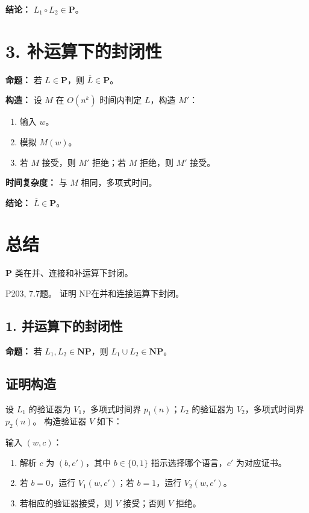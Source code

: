 \documentclass[11pt,addpoints,answers]{exam}
\begin{document}
\begin{questions}
\begin{solution}
    \textbf{结论：} $L_1 \circ L_2 \in \mathbf{P}$。
    \section*{3. 补运算下的封闭性}
    \textbf{命题：} 若 $L \in \mathbf{P}$，则 $\overline{L} \in \mathbf{P}$。
    
    \textbf{构造：} 设 $M$ 在 $O(n^k)$ 时间内判定 $L$，构造 $M'$：
    \begin{enumerate}
        \item 输入 $w$。
        \item 模拟 $M(w)$。
        \item 若 $M$ 接受，则 $M'$ 拒绝；若 $M$ 拒绝，则 $M'$ 接受。
    \end{enumerate}
    \textbf{时间复杂度：} 与 $M$ 相同，多项式时间。
    
    \textbf{结论：} $\overline{L} \in \mathbf{P}$。
    \section*{总结}
    $\mathbf{P}$ 类在并、连接和补运算下封闭。
\end{solution}

\question P203, 7.7题。
证明 NP在并和连接运算下封闭。
\begin{solution}
    
    \section*{1. 并运算下的封闭性}
    
    \textbf{命题：} 若 $L_1, L_2 \in \mathbf{NP}$，则 $L_1 \cup L_2 \in \mathbf{NP}$。
    
    \subsection*{证明构造}
    设 $L_1$ 的验证器为 $V_1$，多项式时间界 $p_1(n)$；$L_2$ 的验证器为 $V_2$，多项式时间界 $p_2(n)$。  
    构造验证器 $V$ 如下：
    
    \noindent 输入 $(w, c)$：
    \begin{enumerate}
        \item 解析 $c$ 为 $(b, c')$，其中 $b \in \{0,1\}$ 指示选择哪个语言，$c'$ 为对应证书。
        \item 若 $b = 0$，运行 $V_1(w, c')$；若 $b = 1$，运行 $V_2(w, c')$。
        \item 若相应的验证器接受，则 $V$ 接受；否则 $V$ 拒绝。
    \end{enumerate}
    

\end{solution}
\end{questions}
\end{document}
